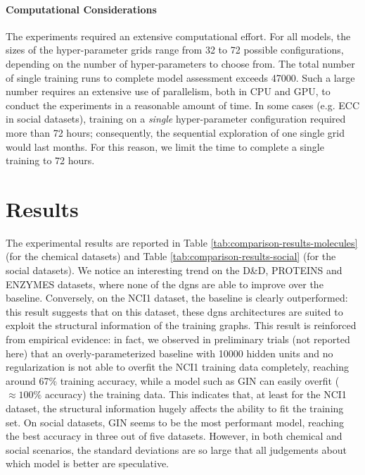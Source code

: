 \paragraph{Computational Considerations}
The experiments required an extensive computational effort. For all models, the sizes of the hyper-parameter grids range from 32 to 72 possible configurations, depending on the number of hyper-parameters to choose from. The total number of single training runs to complete model assessment exceeds 47000. Such a large number requires an extensive use of parallelism, both in CPU and GPU, to conduct the experiments in a reasonable amount of time. In some cases (e.g. ECC in social datasets), training on a \emph{single} hyper-parameter configuration required more than 72 hours; consequently, the sequential exploration of one single grid would last months. For this reason, we limit the time to complete a single training to 72 hours.

\section{Results}
The experimental results are reported in Table \ref{tab:comparison-results-molecules} (for the chemical datasets) and Table \ref{tab:comparison-results-social} (for the social datasets). We notice an interesting trend on the D\&D, PROTEINS and ENZYMES datasets, where none of the \glspl{dgn} are able to improve over the baseline. Conversely, on the NCI1 dataset, the baseline is clearly outperformed: this result suggests that on this dataset, these \glspl{dgn} architectures are suited to exploit the structural information of the training graphs. This result is reinforced from empirical evidence: in fact, we observed in preliminary trials (not reported here) that an overly-parameterized baseline with 10000 hidden units and no regularization is not able to overfit the NCI1 training data completely, reaching around 67\% training accuracy, while a model such as GIN can easily overfit ($\approx 100\%$ accuracy) the training data. This indicates that, at least for the NCI1 dataset, the structural information hugely affects the ability to fit the training set. On social datasets, GIN seems to be the most performant model, reaching the best accuracy in three out of five datasets. However, in both chemical and social scenarios, the standard deviations are so large that all judgements about which model is better are speculative.



